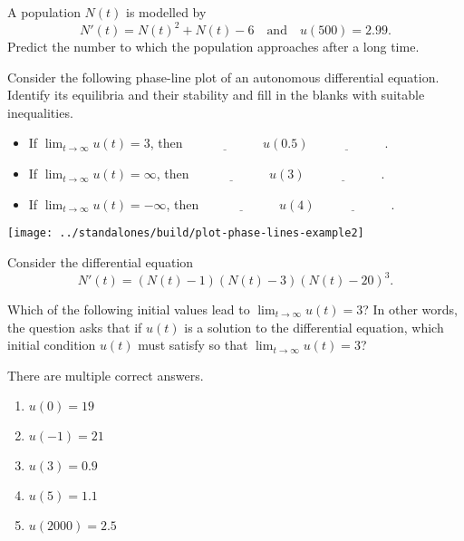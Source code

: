 \documentclass[../main.tex]{subfiles}
\begin{document}
\begin{example}
  A population \(N(t)\) is modelled by 
  \[
    N'(t) = N(t)^{2} + N(t) - 6 \quad\text{and}\quad u(500) = 2.99.
  \]
  Predict the number to which the population approaches after a long time.
\end{example}

\begin{example}
  Consider the following phase-line plot of an autonomous differential equation.  Identify its equilibria and their stability and fill in the blanks with suitable inequalities.
  \begin{itemize}
    \item If \(\lim_{t \to \infty} u(t) = 3\), then \(\underline{\hspace{1in}} u(\text{0.5}) \underline{\hspace{1in}}\). 
    \item If \(\lim_{t \to \infty} u(t) = \infty\), then \(\underline{\hspace{1in}} u(\text{3}) \underline{\hspace{1in}}\). 
    \item If \(\lim_{t \to \infty} u(t) = -\infty\), then \(\underline{\hspace{1in}}  u(\text{4})  \underline{\hspace{1in}}\). 
  \end{itemize}

  \texttt{[image: ../standalones/build/plot-phase-lines-example2]}
\end{example}


\clearpage
\begin{example}
  Consider the differential equation
  \[
    N'(t) = (N(t) - 1) (N(t) - 3) (N(t) - 20)^{3}.
  \]

  Which of the following initial values lead to \(\lim_{t \to \infty} u(t) = 3\)? In other words, the question asks that if \(u(t)\) is a solution to the differential equation, which initial condition \(u(t)\) must satisfy so that \(\lim_{t \to \infty} u(t) = 3\)?

  There are multiple correct answers.
  \begin{enumerate}[label=(\alph*)]
    \item \(u(0) = 19\)
    \item \(u(-1) = 21\)
    \item \(u(3) = 0.9\)
    \item \(u(5) = 1.1\)
    \item \(u(2000) = 2.5\)
  \end{enumerate}
\end{example}
\end{document}
